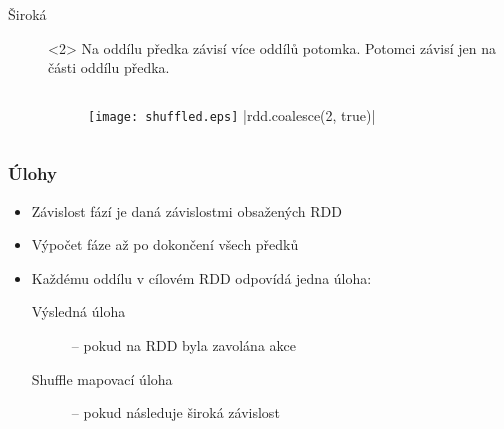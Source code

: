 \documentclass[xcolor=dvipsnames,compact]{beamer}
\begin{document}
\begin{frame}[t]
\begin{description}
{\begin{columns}[T]
\begin{column}{.33\textwidth}
			\end{column}
		\end{columns}
		}
		\item[Široká]<2> Na oddílu předka závisí více oddílů potomka.
		Potomci závisí jen na části oddílu předka.
		\begin{columns}[T] %
			\begin{column}{.33\textwidth}
				\begin{figure}
					\begin{center}
						\texttt{[image: shuffled.eps]}
						|rdd.coalesce(2, true)|
						\caption{\protect{}}
					\end{center}
				\end{figure}
			\end{column}
		\end{columns}
	\end{description}
\end{frame}


\begin{frame}
	\frametitle{Úlohy} 
	\begin{itemize}
		\item Závislost fází je daná závislostmi obsažených RDD
		\item Výpočet fáze až po dokončení všech předků
		\item Každému oddílu v cílovém RDD odpovídá jedna úloha:
		\begin{description}
			\item[Výsledná úloha] -- pokud na RDD byla zavolána akce
			\item[Shuffle mapovací úloha] -- pokud následuje široká závislost
		\end{description}
	\end{itemize}
\end{frame}
\end{document}
